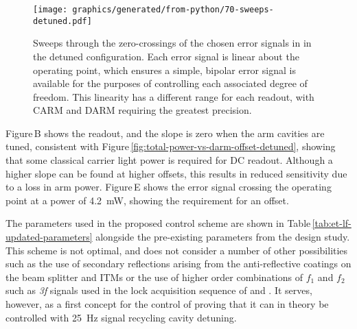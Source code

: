 \begin{figure}
  \centering
  \texttt{[image: graphics/generated/from-python/70-sweeps-detuned.pdf]}
  \caption[Sweeps through the zero-crossings of the chosen error signals in ET-LF]{\label{fig:sweeps-et-lf}Sweeps through the zero-crossings of the chosen error signals in \ETLF{} in the detuned configuration. Each error signal is linear about the operating point, which ensures a simple, bipolar error signal is available for the purposes of controlling each associated degree of freedom. This linearity has a different range for each readout, with \gls{CARM} and \gls{DARM} requiring the greatest precision.}
\end{figure}

Figure\,B shows the \ASDC{} readout, and the slope is zero when the arm cavities are tuned, consistent with Figure\,\ref{fig:total-power-vs-darm-offset-detuned}, showing that some classical carrier light power is required for \gls{DC} readout. Although a higher slope can be found at higher offsets, this results in reduced sensitivity due to a loss in arm power. Figure\,E shows the error signal crossing the operating point at a power of \SI{4.2}{\milli\watt}, showing the requirement for an offset.

The parameters used in the proposed control scheme are shown in Table\,\ref{tab:et-lf-updated-parameters} alongside the pre-existing parameters from the design study. This scheme is not optimal, and does not consider a number of other possibilities such as the use of secondary reflections arising from the anti-reflective coatings on the beam splitter and \glspl{ITM} or the use of higher order combinations of $f_1$ and $f_2$ such as \emph{3f} signals used in the lock acquisition sequence of \VIRGO{} \cite{Acernese2008} and \ALIGO{} \cite{Staley2014}. It serves, however, as a first concept for the control of \ETLF{} proving that it can in theory be controlled with \SI{25}{\hertz} signal recycling cavity detuning.

